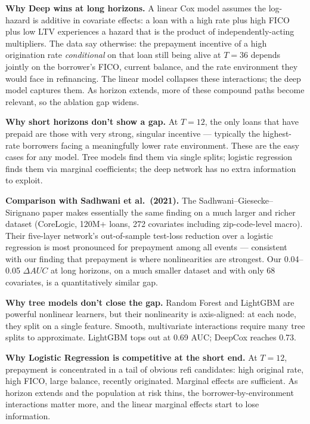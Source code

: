 \documentclass[11pt,a4paper]{article}
\begin{document}
\textbf{Why Deep wins at long horizons.} A linear Cox model assumes the log-hazard is additive in covariate effects: a loan with a high rate plus high FICO plus low LTV experiences a hazard that is the product of independently-acting multipliers. The data say otherwise: the prepayment incentive of a high origination rate \emph{conditional} on that loan still being alive at $T{=}36$ depends jointly on the borrower's FICO, current balance, and the rate environment they would face in refinancing. The linear model collapses these interactions; the deep model captures them. As horizon extends, more of these compound paths become relevant, so the ablation gap widens.

\textbf{Why short horizons don't show a gap.} At $T{=}12$, the only loans that have prepaid are those with very strong, singular incentive --- typically the highest-rate borrowers facing a meaningfully lower rate environment. These are the easy cases for any model. Tree models find them via single splits; logistic regression finds them via marginal coefficients; the deep network has no extra information to exploit.

\textbf{Comparison with Sadhwani et al.\ (2021).} The Sadhwani--Giesecke--Sirignano paper makes essentially the same finding on a much larger and richer dataset (CoreLogic, 120M+ loans, 272 covariates including zip-code-level macro). Their five-layer network's out-of-sample test-loss reduction over a logistic regression is most pronounced for prepayment among all events --- consistent with our finding that prepayment is where nonlinearities are strongest. Our 0.04--0.05 $\Delta AUC$ at long horizons, on a much smaller dataset and with only 68 covariates, is a quantitatively similar gap.

\textbf{Why tree models don't close the gap.} Random Forest and LightGBM are powerful nonlinear learners, but their nonlinearity is axis-aligned: at each node, they split on a single feature. Smooth, multivariate interactions require many tree splits to approximate. LightGBM tops out at 0.69 AUC; DeepCox reaches 0.73.

\textbf{Why Logistic Regression is competitive at the short end.} At $T{=}12$, prepayment is concentrated in a tail of obvious refi candidates: high original rate, high FICO, large balance, recently originated. Marginal effects are sufficient. As horizon extends and the population at risk thins, the borrower-by-environment interactions matter more, and the linear marginal effects start to lose information.
\end{document}
